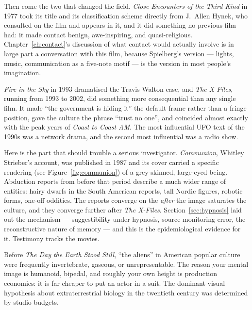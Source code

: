 Then come the two that changed the field. \emph{Close Encounters of the Third Kind} in 1977 took its
title and its classification scheme directly from J.\ Allen Hynek, who consulted on the film and
appears in it, and it did something no previous film had: it made contact benign, awe-inspiring, and
quasi-religious. Chapter~\ref{ch:contact}'s discussion of what contact would actually involve is in
large part a conversation with this film, because Spielberg's version --- lights, music,
communication as a five-note motif --- is the version in most people's imagination.

\emph{Fire in the Sky} in 1993 dramatised the Travis Walton case, and \emph{The X-Files}, running from
1993 to 2002, did something more consequential than any single film. It made ``the government is
hiding it'' the default frame rather than a fringe position, gave the culture the phrase ``trust no
one'', and coincided almost exactly with the peak years of \emph{Coast to Coast AM}. The most
influential UFO text of the 1990s was a network drama, and the second most influential was a radio
show.

\ufofloatnext
{}
Here is the part that should trouble a serious investigator. \emph{Communion}, Whitley Strieber's
account, was published in 1987 and its cover carried a specific rendering (see Figure~\ref{fig:communion}) of a grey-skinned,
large-eyed being. Abduction reports from before that period describe a much wider range of entities:
hairy dwarfs in the South American reports, tall Nordic figures, robotic forms, one-off oddities. The
reports converge on the  \emph{after} the image saturates the culture, and they converge
further after \emph{The X-Files}. Section~\ref{sec:hypnosis} laid out the mechanism --- suggestibility under
hypnosis, source-monitoring error, the reconstructive nature of memory --- and this is the
epidemiological evidence for it. Testimony tracks the movies.

\begin{funfact}
Before \emph{The Day the Earth Stood Still}, ``the aliens'' in American popular culture were
frequently invertebrate, gaseous, or unrepresentable. The reason your mental image is humanoid,
bipedal, and roughly your own height is production economics: it is far cheaper to put an actor in a
suit. The dominant visual hypothesis about extraterrestrial biology in the twentieth century was
determined by studio budgets.
\end{funfact}

